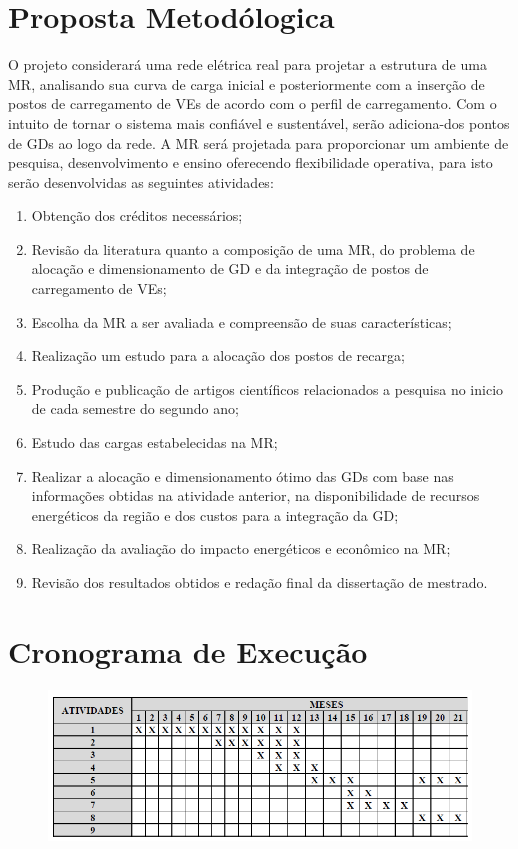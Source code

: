 \documentclass[]{IEEEphot}
\begin{document}
\section{Proposta Metodólogica}
O projeto considerará uma rede elétrica real para projetar a estrutura de uma MR, analisando sua curva de carga inicial e posteriormente com a inserção de postos de carregamento de VEs de acordo com o perfil de carregamento. Com o intuito de tornar o sistema mais confiável e sustentável, serão adiciona-dos pontos de GDs ao logo da rede. A MR será projetada para proporcionar um ambiente  de pesquisa, desenvolvimento e ensino oferecendo flexibilidade operativa, para isto serão desenvolvidas as seguintes atividades:
\begin{enumerate}
	\item Obtenção dos créditos necessários;
	\item Revisão da literatura quanto a composição de uma MR, do problema de alocação e dimensionamento de GD e da integração de postos de carregamento de VEs;
	\item Escolha da MR a ser avaliada e compreensão de suas características;
	\item Realização um estudo para a alocação dos postos de recarga;
	\item Produção e publicação de artigos científicos relacionados a pesquisa no inicio de cada semestre do segundo ano;
	\item Estudo das cargas estabelecidas na MR;
	\item Realizar a alocação e dimensionamento ótimo das GDs com base nas informações obtidas na atividade anterior, na disponibilidade de recursos energéticos da região e dos custos para a integração da GD;
	\item Realização da avaliação do impacto energéticos e econômico na MR;
	\item Revisão dos resultados obtidos e redação final da dissertação de mestrado.
\end{enumerate}
\section{Cronograma de Execução}
\begin{figure}[!htbp]
	\centering
	\includegraphics[scale=0.8]{cronograma}
\end{figure}
\nocite{*}


\end{document}
